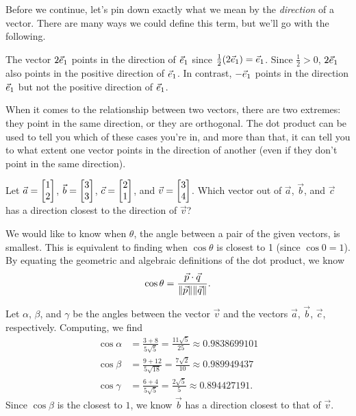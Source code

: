 \medskip
Before we continue, let's pin down exactly what we mean by
the \emph{direction} of a vector.
There are many ways we could define
this term, but we'll go with the following.


The vector $2{\vec e_1}$ points in the direction of ${\vec e_1}$ since
$\frac{1}{2}(2{\vec e_1})={\vec e_1}$.  Since $\frac{1}{2}>0$, $2{\vec e_1}$ also points
in the positive direction of ${\vec e_1}$. In contrast,
$-{\vec e_1}$ points in the direction ${\vec e_1}$ but not the positive direction of ${\vec e_1}$.

When it comes to the relationship between two vectors, there are two extremes: they
point in the same direction, or they are orthogonal. The dot product can be used to
tell you which of these cases you're in, and more than that, it can tell you to
what extent one vector points in the direction of another (even if they don't point in
the same direction).

\begin{example}
	Let $\vec a=\mat{1\\2}$, $\vec b=\mat{3\\3}$, $\vec c=\mat{2\\1}$, and $\vec v=\mat{3\\4}$. Which vector out of
	$\vec a$, $\vec b$, and $\vec c$ has a direction closest to the direction of $\vec v$?

	We would like to know when $\theta$, the angle between a pair of the given vectors, is smallest.
	This is equivalent to finding when $\cos\theta$ is closest to 1 (since $\cos0=1$).
    	By equating the geometric and algebraic definitions of the dot product, we know
	    \[
        	\cos\theta = \frac{\vec p\cdot\vec q}{\lVert\vec p\rVert\lVert\vec q\rVert}.
	    \]

    Let $\alpha$, $\beta$, and $\gamma$ be the angles between the vector $\vec v$ and
	the vectors $\vec a$, $\vec b$, $\vec c$, respectively. Computing, we find
	\begin{align*}
	    \cos \alpha &= \frac{3+8}{5\sqrt{5}}=\frac{11\sqrt{5}}{25} \approx 0.9838699101 \\
		\cos \beta &= \frac{9+12}{5\sqrt{18}} =\frac{7\sqrt{2}}{10} \approx 0.989949437\\
	    \cos \gamma &= \frac{6+4}{5\sqrt{5}}=\frac{2\sqrt{5}}{5} \approx 0.894427191.
	\end{align*}
	Since $\cos \beta$ is the closest to $1$, we know $\vec b$ has a direction closest to that of $\vec v$.
\end{example}


